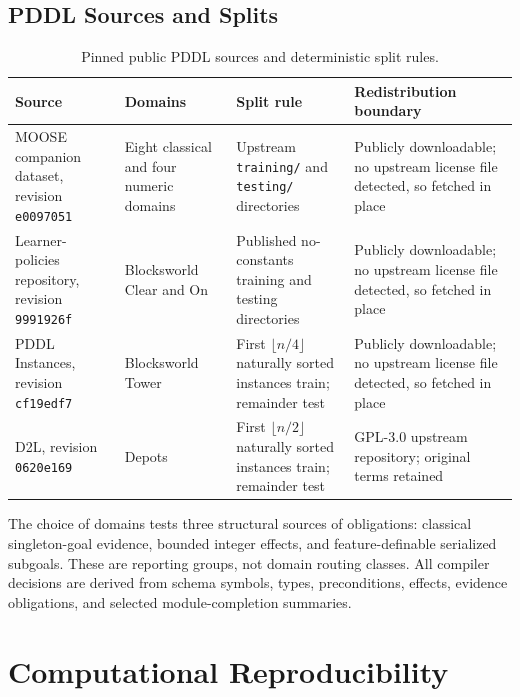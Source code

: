 \subsection{PDDL Sources and Splits}

\begin{table}[htbp]
\centering
\small
\setlength{\tabcolsep}{3pt}
\begin{tabular}{>{\raggedright\arraybackslash}p{}
	>{\raggedright\arraybackslash}p{}
	>{\raggedright\arraybackslash}p{}
	>{\raggedright\arraybackslash}p{}}
\toprule
Source & Domains & Split rule & Redistribution boundary \\
\midrule
MOOSE companion dataset, revision
\texttt{e0097051} \cite{DillonZChenMooseDataset} &
Eight classical and four numeric domains &
Upstream \texttt{training/} and \texttt{testing/} directories &
Publicly downloadable; no upstream license file detected, so fetched in place \\
Learner-policies repository, revision
\texttt{9991926f} \cite{BonetLearnerPoliciesRepository} &
Blocksworld Clear and On &
Published no-constants training and testing directories &
Publicly downloadable; no upstream license file detected, so fetched in place \\
PDDL Instances, revision
\texttt{cf19edf7} \cite{Bacchus2001AIPS00,PotasscoPDDLInstances} &
Blocksworld Tower &
First $\lfloor n/4\rfloor$ naturally sorted instances train; remainder test &
Publicly downloadable; no upstream license file detected, so fetched in place \\
D2L, revision \texttt{0620e169} \cite{RLeapD2LRepository} &
Depots &
First $\lfloor n/2\rfloor$ naturally sorted instances train; remainder test &
GPL-3.0 upstream repository; original terms retained \\
\bottomrule
\end{tabular}
\caption{Pinned public PDDL sources and deterministic split rules.}
\label{tab:data-sources}
\end{table}

The choice of domains tests three structural sources of obligations: classical
singleton-goal evidence, bounded integer effects, and feature-definable
serialized subgoals. These are reporting groups, not domain routing classes.
All compiler decisions are derived from schema symbols, types, preconditions,
effects, evidence obligations, and selected module-completion summaries.

\section{Computational Reproducibility}
\label{app:reproducibility}

